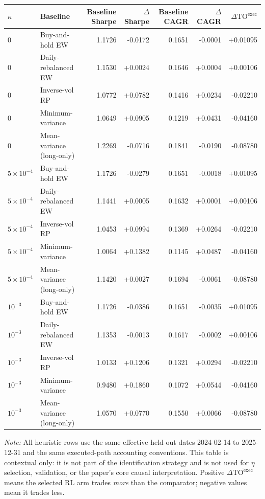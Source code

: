 \documentclass[10pt,twocolumn]{article}
\newcommand{\TOexec}{\mathrm{TO}^{\mathrm{exec}}}
\newcommand{\kappaTC}{\kappa}
\begin{document}
\begin{center}
\captionsetup{type=table}
\label{tab:selected_vs_external}
\scriptsize
\begin{tabular}{@{}llrrrrr@{}}
\toprule
$\kappaTC$ & Baseline & Baseline Sharpe & $\Delta$Sharpe & Baseline CAGR & $\Delta$CAGR & $\Delta\overline{\TOexec}$ \\
\midrule
$0$ & Buy-and-hold EW & 1.1726 & -0.0172 & 0.1651 & -0.0001 & +0.01095 \\
$0$ & Daily-rebalanced EW & 1.1530 & +0.0024 & 0.1646 & +0.0004 & +0.00106 \\
$0$ & Inverse-vol RP & 1.0772 & +0.0782 & 0.1416 & +0.0234 & -0.02210 \\
$0$ & Minimum-variance & 1.0649 & +0.0905 & 0.1219 & +0.0431 & -0.04160 \\
$0$ & Mean-variance (long-only) & 1.2269 & -0.0716 & 0.1841 & -0.0190 & -0.08780 \\
$5\times10^{-4}$ & Buy-and-hold EW & 1.1726 & -0.0279 & 0.1651 & -0.0018 & +0.01095 \\
$5\times10^{-4}$ & Daily-rebalanced EW & 1.1441 & +0.0005 & 0.1632 & +0.0001 & +0.00106 \\
$5\times10^{-4}$ & Inverse-vol RP & 1.0453 & +0.0994 & 0.1369 & +0.0264 & -0.02210 \\
$5\times10^{-4}$ & Minimum-variance & 1.0064 & +0.1382 & 0.1145 & +0.0487 & -0.04160 \\
$5\times10^{-4}$ & Mean-variance (long-only) & 1.1420 & +0.0027 & 0.1694 & -0.0061 & -0.08780 \\
$10^{-3}$ & Buy-and-hold EW & 1.1726 & -0.0386 & 0.1651 & -0.0035 & +0.01095 \\
$10^{-3}$ & Daily-rebalanced EW & 1.1353 & -0.0013 & 0.1617 & -0.0002 & +0.00106 \\
$10^{-3}$ & Inverse-vol RP & 1.0133 & +0.1206 & 0.1321 & +0.0294 & -0.02210 \\
$10^{-3}$ & Minimum-variance & 0.9480 & +0.1860 & 0.1072 & +0.0544 & -0.04160 \\
$10^{-3}$ & Mean-variance (long-only) & 1.0570 & +0.0770 & 0.1550 & +0.0066 & -0.08780 \\
\bottomrule
\end{tabular}
\par\vspace{2pt}\raggedright\footnotesize{\textit{Note:} All heuristic rows use the same effective held-out dates 2024-02-14 to 2025-12-31 and the same executed-path accounting conventions. This table is contextual only: it is not part of the identification strategy and is not used for $\eta$ selection, validation, or the paper's core causal interpretation. Positive $\Delta\overline{\TOexec}$ means the selected RL arm trades \emph{more} than the comparator; negative values mean it trades less.}
\end{center}
\end{document}
